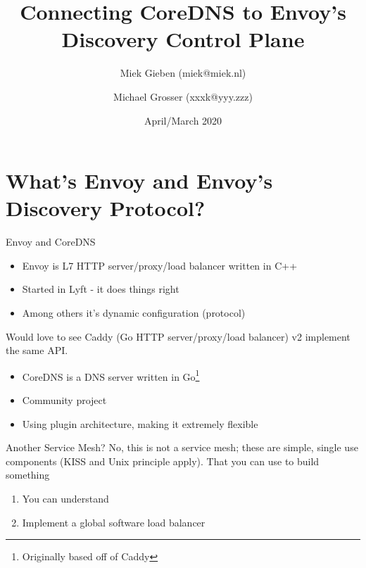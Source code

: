 \documentclass[aspectratio=169]{beamer}
\title{Connecting CoreDNS to Envoy's Discovery Control Plane}
\date{April/March 2020}
\author{Miek Gieben (miek@miek.nl) \and Michael Grosser (xxxk@yyy.zzz)}
\institute{Centre for protobuf Nerding}
\begin{document}
    \let\oldfootnotesize\footnotesize
    \renewcommand*{\footnotesize}{\oldfootnotesize\tiny}

    \maketitle

    \section{What's Envoy and Envoy's Discovery Protocol?}
    \begin{frame}{Envoy and CoreDNS}
        \begin{itemize}
            \item Envoy is L7 HTTP server/proxy/load balancer written in C++
            \item Started in Lyft - it does things right
            \item Among others it's dynamic configuration (protocol)
        \end{itemize}
        Would love to see Caddy (Go HTTP server/proxy/load balancer) v2 implement the same API.
        \begin{itemize}
            \item CoreDNS is a DNS server written in Go\footnote{Originally based off of Caddy}
            \item Community project
            \item Using plugin architecture, making it extremely flexible
        \end{itemize}
    \end{frame}

    \begin{frame}{Another Service Mesh?}
        No, this is not a service mesh; these are simple, single use components (KISS and Unix principle apply). That you can use
        to build something
        \begin{enumerate}
            \item You can understand
            \item Implement a global software load balancer
        \end{enumerate}
    \end{frame}
\end{document}
